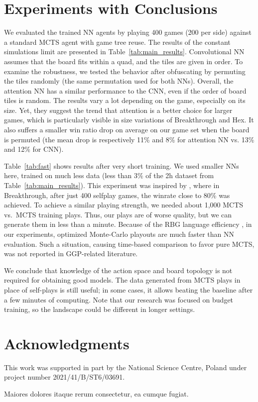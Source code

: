 \documentclass[letterpaper]{article} %
\begin{document}
\vspace{-3.65mm}
\section{Experiments with Conclusions}

We evaluated the trained NN agents by playing 400 games (200 per side) against a standard MCTS agent with game tree reuse. The results of the constant simulations limit are presented in Table~\ref{tab:main_results}.
Convolutional NN assumes that the board fits within a quad, and the tiles are given in order.
To examine the robustness, we tested the behavior after obfuscating by permuting the tiles randomly (the same permutation used for both NNs).
Overall, the attention NN has a similar performance to the CNN, even if the order of board tiles is random. The results vary a lot depending on the game, especially on its size.
Yet, they suggest the trend that attention is a better choice for larger games, which is particularly visible in size variations of Breakthrough and Hex.
It also suffers a smaller win ratio drop on average on our game set when the board is permuted (the mean drop is respectively 11\% and 8\% for attention NN vs. 13\% and 12\% for CNN).

Table~\ref{tab:fast} shows results after very short training.
We used smaller NNs here, trained on much less data (less than $3\%$ of the 2h dataset from Table~\ref{tab:main_results}).
This experiment was inspired by \cite{ThielscherAAAI20}, where in Breakthrough, after just 400 selfplay games, the winrate close to 80\% was achieved.
To achieve a similar playing strength, we needed about 1,000 MCTS vs.\ MCTS training plays. Thus, our plays are of worse quality, but we can generate them in less than a minute.
Because of the RBG language efficiency \cite{Kowalski2020EfficientReasoning}, in our experiments, optimized Monte-Carlo playouts are much faster than NN evaluation. Such a situation, causing time-based comparison to favor pure MCTS, was not reported in GGP-related literature.

We conclude that knowledge of the action space and board topology is not required for obtaining good models.
The data generated from MCTS plays in place of self-plays is still useful; in some cases, it allows beating the baseline after a few minutes of computing.
Note that our research was focused on budget training, so the landscape could be different in longer settings.




\vspace{-3.59mm}
\section{Acknowledgments}
This work was supported in part by the National Science Centre, Poland under project number 2021/41/B/ST6/03691.

Maiores dolores itaque rerum consectetur, ea cumque fugiat.\clearpage

\end{document}
